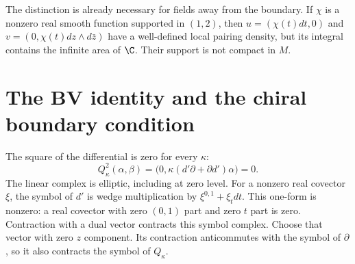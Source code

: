 The distinction is already necessary for fields away from the
boundary.  If $\chi$ is a nonzero real smooth function supported in
$(1,2)$, then $u=(\chi(t)dt,0)$ and
$v=(0,\chi(t)dz\wedge d\bar z)$ have a well-defined local pairing
density, but its integral contains the infinite area of $\C$.
Their support is not compact in $M$.

\section{The BV identity and the chiral boundary condition}

The square of the differential is zero for every $\kappa$:
\[
 Q_\kappa^2(\alpha,\beta)
 =\bigl(0,\kappa(d'\partial+\partial d')\alpha\bigr)=0.
\]
The linear complex is elliptic, including at zero level.  For a
nonzero real covector $\xi$, the symbol of $d'$ is wedge multiplication
by $\xi^{0,1}+\xi_tdt$.  This one-form is nonzero: a real covector
with zero $(0,1)$ part and zero $t$ part is zero.  Contraction with a
dual vector contracts this symbol complex.  Choose that vector with
zero $z$ component.  Its contraction anticommutes with the symbol of
$\partial$, so it also contracts the symbol of $Q_\kappa$.

